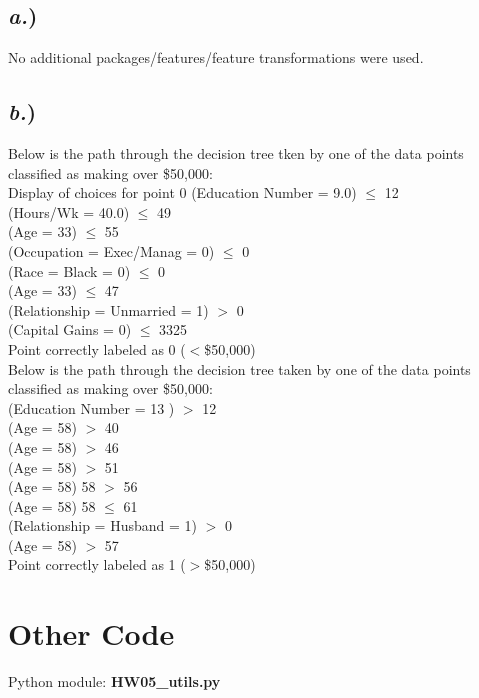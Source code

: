 \documentclass{report}
\begin{document}
\subsection*{\textit{a.})}

No additional packages/features/feature transformations were used.


\subsection*{\textit{b.})}

Below is the path through the decision tree tken by one of the data points classified as making over \$50,000: \\
Display of choices for point 0
(Education Number = 9.0) $\leq$ 12\\
(Hours/Wk = 40.0) $\leq$ 49\\
(Age = 33) $\leq$ 55\\
(Occupation = Exec/Manag = 0) $\leq$ 0\\
(Race = Black = 0) $\leq$ 0\\
(Age = 33) $\leq$ 47\\
(Relationship = Unmarried = 1) $>$ 0\\
(Capital Gains = 0) $\leq$ 3325\\
Point correctly labeled as 0 ($<$\$50,000)\\

Below is the path through the decision tree taken by one of the data points classified as making over \$50,000: \\
(Education Number = 13 ) $>$ 12\\
(Age = 58) $>$ 40\\
(Age = 58) $>$ 46\\
(Age = 58) $>$ 51\\
(Age = 58)  58 $>$ 56\\
(Age = 58)  58 $\leq$ 61\\
(Relationship = Husband = 1) $>$ 0\\
(Age = 58) $>$ 57\\
Point correctly labeled as 1 ($>$\$50,000)



\section*{Other Code}
{\large Python module: \textbf{HW05\_utils.py}}\\

\end{document}
